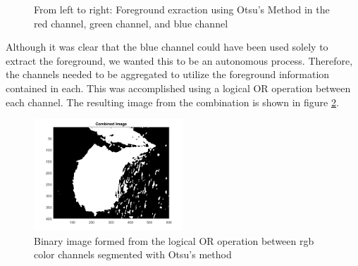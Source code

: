 \documentclass{article}[12 pt]
\begin{document}
\begin{figure}[H]
\captionsetup[subfloat]{labelformat=empty}
\centering
{} 
\caption{From left to right: Foreground exraction using Otsu's Method in the red channel, green channel, and blue channel}
\label{otsu}
\end{figure}

\noindent
Although it was clear that the blue channel could have been used solely to extract the foreground, we wanted this to be an autonomous process.  Therefore, the channels needed to be aggregated to utilize the foreground information contained in each.  This was accomplished using a logical OR operation between each channel.  The resulting image from  the combination is shown in figure \ref{combinedImage}.


\begin{center}
	\begin{figure}[H]
		\centering
		\includegraphics[width = 0.5\textwidth]{Images/combinedImage.png}
		\caption{Binary image formed from the logical OR operation between rgb color channels segmented with Otsu's method}
		\label{combinedImage}
	\end{figure}
\end{center}
\end{document}

